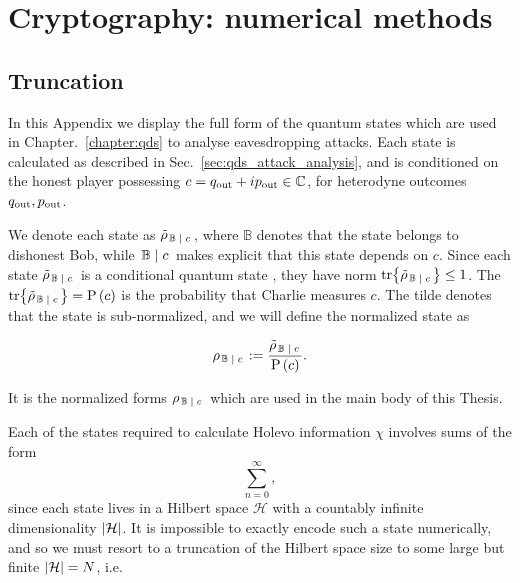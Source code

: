 \chapter{Cryptography: numerical methods}\label{appendix:crypto_numerical_methods}

\section{Truncation}
In this Appendix we display the full form of the quantum states which are used in Chapter.~\ref{chapter:qds} to analyse eavesdropping attacks. Each state is calculated as described in Sec.~\ref{sec:qds_attack_analysis}, and is conditioned on the honest player possessing $c = q_{\text{out}} + i p_{\text{out}} \in \mathbb{C}$, for heterodyne outcomes $q_{\text{out}}, p_{\text{out}}$.

We denote each state as $\tilde{\rho}_{\left. \mathbb{B} \; \middle| \; c\right.}$, where $\mathbb{B}$ denotes that the state belongs to dishonest Bob, while $\left. \mathbb{B} \; \middle| \; c \right.$ makes explicit that this state depends on $c$. Since each state $\tilde{\rho}_{\left. \mathbb{B} \; \middle| \; c\right.}$ is a conditional quantum state \cite{Nielsen2010}, they have norm $\tr{\tilde{\rho}_{\left. \mathbb{B} \; \middle| \;c\right.}}\le 1$. The $\tr{\tilde{\rho}_{\left. \mathbb{B} \; \middle| \;c\right.}} = \text{P}\left(c\right)$ is the probability that Charlie measures $c$. The tilde denotes that the state is sub-normalized, and we will define the normalized state as

\begin{equation}
\rho_{\left. \mathbb{B} \; \middle| \; c \right.} := \frac{\tilde{\rho}_{\left. \mathbb{B} \; \middle| \; c\right.}}{\text{P}\left(c\right)}.
\end{equation}

\noindent It is the normalized forms $\rho_{\left. \mathbb{B} \; \middle| \; c \right.}$ which are used in the main body of this Thesis.

Each of the states required to calculate Holevo information $\chi$ involves sums of the form
\begin{equation}
\sum_{n = 0}^\infty ,
\end{equation}
since each state lives in a Hilbert space $\mathcal{H}$ with a countably infinite dimensionality $\left|\mathcal{H}\right|$. It is impossible to exactly encode such a state numerically, and so we must resort to a truncation of the Hilbert space size to some large but finite $\left|\mathcal{H}\right| = N$, i.e.

